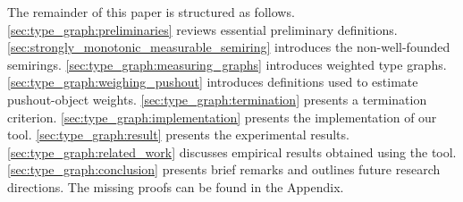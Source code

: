 The remainder of this paper is structured as follows.  
\autoref{sec:type_graph:preliminaries} reviews essential preliminary definitions. 
\autoref{sec:strongly_monotonic_measurable_semiring} introduces the non-well-founded semirings. 
\autoref{sec:type_graph:measuring_graphs} introduces weighted type graphs.  
\autoref{sec:type_graph:weighing_pushout} introduces definitions used to estimate pushout-object weights.   
\autoref{sec:type_graph:termination} presents a termination criterion. 
\autoref{sec:type_graph:implementation} presents the implementation of our tool. 
\autoref{sec:type_graph:result} presents the experimental results.
 \autoref{sec:type_graph:related_work} discusses empirical results obtained using the tool. 
\autoref{sec:type_graph:conclusion} presents brief remarks and outlines future research directions. The missing proofs can be found in the Appendix.
